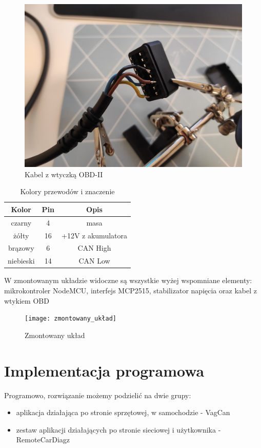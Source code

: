 \documentclass[10pt,a4paper]{scrartcl}
\begin{document}
		
		\begin{figure}[H]
			\centering
			\includegraphics[width=0.7\linewidth]{kabel_obd_2}
			\caption[Kabel z wtyczką OBD-II]{Kabel z wtyczką OBD-II}
			\label{fig:kabelobd2}
		\end{figure}
		
			\begin{table}[H]
			\caption{Kolory przewodów i znaczenie}
			\begin{tabular}{|c|c|c|}
				\hline
				Kolor & Pin & Opis \\
				\hline
				czarny & 4 & masa \\
				\hline
				żółty & 16 & +12V z akumulatora \\
				\hline
				brązowy &6 & CAN High \\			
				\hline
				niebieski &14 & CAN Low \\			
				\hline
			\end{tabular}
		\end{table} 	
		W zmontowanym układzie widoczne są wszystkie wyżej wspomniane elementy: mikrokontroler NodeMCU, interfejs MCP2515, stabilizator napięcia oraz kabel z wtykiem OBD
		\begin{figure}[H]
			\centering
			\texttt{[image: zmontowany\_układ]}
			\caption[Zmontowany układ]{Zmontowany układ}
			\label{fig:zmontowanyukad}
		\end{figure}
		
		
	
	\section{Implementacja programowa}
	Programowo, rozwiązanie możemy podzielić na dwie grupy:
		\begin{itemize}
			\item aplikacja działająca po stronie sprzętowej, w samochodzie - VagCan
			\item zestaw aplikacji działających po stronie sieciowej i użytkownika - RemoteCarDiagz
		\end{itemize}
\end{document}
